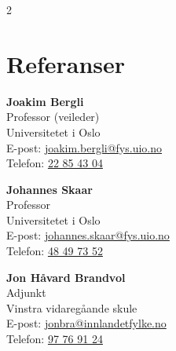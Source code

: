 \documentclass[a4paper,10pt]{article}
\begin{document}
\begin{paracol}{2}
\section*{Referanser}
\textbf{Joakim Bergli} \\ Professor (veileder)\\ Universitetet i Oslo \\ E-post: \href{mailto:joakim.bergli@fys.uio.no}{joakim.bergli@fys.uio.no} \\ Telefon: \href{tel:+4722854304}{22 85 43 04} 

\vspace{0.3cm} 

\textbf{Johannes Skaar} \\ Professor \\ Universitetet i Oslo \\ E-post: \href{mailto:johannes.skaar@fys.uio.no}{johannes.skaar@fys.uio.no} \\ Telefon: \href{tel:+4748497352}{48 49 73 52} 

\vspace{0.3cm}

\textbf{Jon Håvard Brandvol} \\ Adjunkt \\ Vinstra vidaregåande skule \\ E-post: \href{mailto:jonbra@innlandetfylke.no}{jonbra@innlandetfylke.no} \\ Telefon: \href{tel:+4797769124}{97 76 91 24}


\end{paracol}
\end{document}
